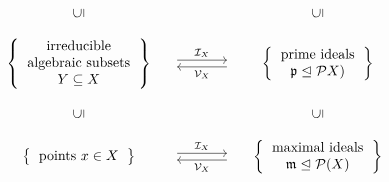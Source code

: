 \begin{theorem}
\begin{enumerate}
\[\begin{matrix}
          \\
            {}
          & {}
          & {}
          \\
            \rotatebox[origin=c]{90}{$\subseteq$}
          & {}
          & \rotatebox[origin=c]{90}{$\subseteq$}
          \\
            {}
          & {}
          & {}
          \\
            \left\{
              \begin{tabular}{c}
                  irreducible \\
                  algebraic subsets \\
                  $Y \subseteq X$
              \end{tabular}
            \right\}
          & \begin{tikzcd}[column sep = large]
                {}
                \arrow[shift left]{r}{\mc{I}_X}
              & {}
                \arrow[shift left]{l}{\mc{V}_X}
            \end{tikzcd}
          & \left\{
              \begin{tabular}{c}
                prime ideals \\
                $\mf{p} \idealleq \mc{P}X)$
              \end{tabular}
            \right\}
          \\
            {}
          & {}
          & {}
          \\
            \rotatebox[origin=c]{90}{$\subseteq$}
          & {}
          & \rotatebox[origin=c]{90}{$\subseteq$}
          \\
            {}
          & {}
          & {}
          \\
            \left\{
              \begin{tabular}{c}
                points $x \in X$
              \end{tabular}
            \right\}
          & \begin{tikzcd}[column sep = large]
                {}
                \arrow[shift left]{r}{\mc{I}_X}
              & {}
                \arrow[shift left]{l}{\mc{V}_X}
            \end{tikzcd}
          & \left\{
              \begin{tabular}{c}
                maximal ideals \\
                $\mf{m} \idealleq \mc{P}(X)$
              \end{tabular}
            \right\}
        \end{matrix}
      \]
  \end{enumerate}
\end{theorem}





